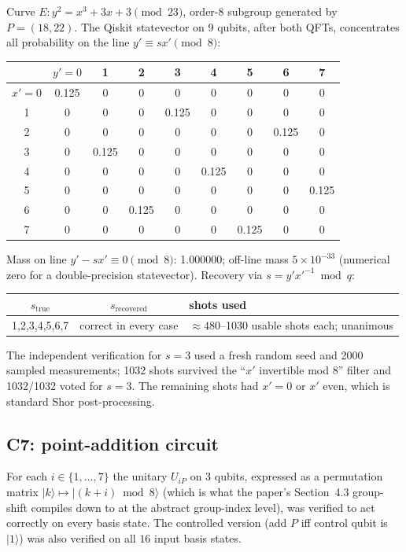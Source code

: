 \documentclass[10pt,letterpaper]{article}
\begin{document}
Curve $E:y^2=x^3+3x+3\pmod{23}$, order-8 subgroup generated by
$P=(18,22)$.  The Qiskit statevector on 9 qubits, after both QFTs,
concentrates all probability on the line $y'\equiv sx'\pmod 8$:
\begin{center}
\begin{tabular}{c|cccccccc}
\toprule
 & $y'\!=\!0$ & 1 & 2 & 3 & 4 & 5 & 6 & 7 \\
\midrule
$x'\!=\!0$ & 0.125 & 0 & 0 & 0 & 0 & 0 & 0 & 0 \\
1 & 0 & 0 & 0 & 0.125 & 0 & 0 & 0 & 0 \\
2 & 0 & 0 & 0 & 0 & 0 & 0 & 0.125 & 0 \\
3 & 0 & 0.125 & 0 & 0 & 0 & 0 & 0 & 0 \\
4 & 0 & 0 & 0 & 0 & 0.125 & 0 & 0 & 0 \\
5 & 0 & 0 & 0 & 0 & 0 & 0 & 0 & 0.125 \\
6 & 0 & 0 & 0.125 & 0 & 0 & 0 & 0 & 0 \\
7 & 0 & 0 & 0 & 0 & 0 & 0.125 & 0 & 0 \\
\bottomrule
\end{tabular}
\end{center}
Mass on line $y'\!-\!sx'\!\equiv\!0\pmod 8$: 1.000000; off-line mass
$5{\times}10^{-33}$ (numerical zero for a double-precision statevector).
Recovery via $s=y'x'^{-1}\bmod q$:

\begin{center}
\begin{tabular}{ccl}
\toprule
$s_\text{true}$ & $s_\text{recovered}$ & shots used \\
\midrule
1,2,3,4,5,6,7 & correct in every case & $\approx 480$--1030 usable shots each; unanimous \\
\bottomrule
\end{tabular}
\end{center}

The independent verification for $s{=}3$ used a fresh random seed and 2000
sampled measurements; 1032 shots survived the ``$x'$ invertible mod 8''
filter and 1032/1032 voted for $s{=}3$.  The remaining shots had $x'{=}0$
or $x'$ even, which is standard Shor post-processing.

\subsection{C7: point-addition circuit}

For each $i\in\{1,\dots,7\}$ the unitary $U_{iP}$ on 3 qubits, expressed
as a permutation matrix $|k\rangle\mapsto|(k{+}i)\bmod 8\rangle$ (which is
what the paper's Section~4.3 group-shift compiles down to at the abstract
group-index level), was verified to act correctly on every basis state.
The controlled version (add $P$ iff control qubit is $|1\rangle$) was also
verified on all $16$ input basis states.
\end{document}

